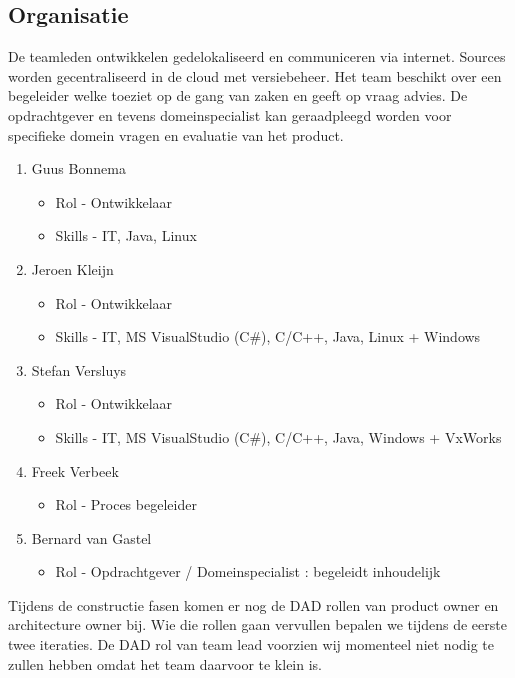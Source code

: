 \subsection{Organisatie}
 De teamleden ontwikkelen gedelokaliseerd en communiceren via internet. Sources worden gecentraliseerd
 in de cloud met versiebeheer. Het team beschikt over een begeleider welke toeziet op de gang van zaken
 en geeft op vraag advies. De opdrachtgever en tevens domeinspecialist kan geraadpleegd worden voor
 specifieke domein vragen en evaluatie van het product.
 \begin{enumerate}
 	\item Guus Bonnema
 	\begin{itemize}
		\item Rol - Ontwikkelaar
		\item Skills - IT, Java, Linux
	\end{itemize}
 	\item Jeroen Kleijn
 	\begin{itemize}
		\item Rol - Ontwikkelaar
		\item Skills - IT,  MS VisualStudio (C\#), C/C++, Java, Linux + Windows
	\end{itemize}
 	\item Stefan Versluys
 	\begin{itemize}
		\item Rol - Ontwikkelaar
		\item Skills - IT,  MS VisualStudio (C\#), C/C++, Java, Windows + VxWorks
	\end{itemize}
	\item Freek Verbeek
	\begin{itemize}
		\item Rol - Proces begeleider
	\end{itemize}
	\item Bernard van Gastel
	\begin{itemize}
		\item Rol - Opdrachtgever / Domeinspecialist : begeleidt inhoudelijk
	\end{itemize}
 \end{enumerate}

 Tijdens de constructie fasen komen er nog de DAD rollen van product owner en architecture owner bij.
 Wie die rollen gaan vervullen bepalen we tijdens de eerste twee iteraties. De DAD rol van team lead
 voorzien wij momenteel niet nodig te zullen hebben omdat het team daarvoor te klein is.


